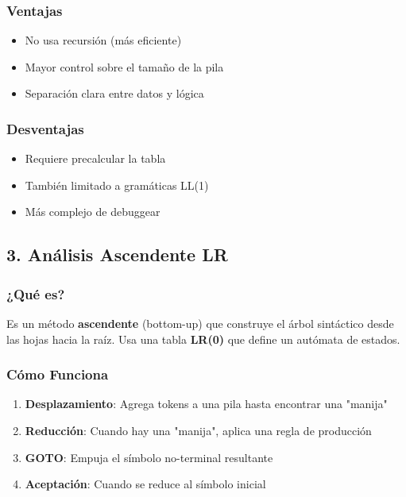\documentclass[12pt]{article}
\begin{document}
\subsubsection{Ventajas}

\begin{itemize}
    \item No usa recursión (más eficiente)
    \item Mayor control sobre el tamaño de la pila
    \item Separación clara entre datos y lógica
\end{itemize}

\subsubsection{Desventajas}

\begin{itemize}
    \item Requiere precalcular la tabla
    \item También limitado a gramáticas LL(1)
    \item Más complejo de debuggear
\end{itemize}


\subsection{3. Análisis Ascendente LR}

\subsubsection{¿Qué es?}

Es un método \textbf{ascendente} (bottom-up) que construye el árbol sintáctico desde las hojas hacia la raíz. Usa una tabla \textbf{LR(0)} que define un autómata de estados.

\subsubsection{Cómo Funciona}

\begin{enumerate}
    \item \textbf{Desplazamiento}: Agrega tokens a una pila hasta encontrar una "manija"
    \item \textbf{Reducción}: Cuando hay una "manija", aplica una regla de producción
    \item \textbf{GOTO}: Empuja el símbolo no-terminal resultante
    \item \textbf{Aceptación}: Cuando se reduce al símbolo inicial
\end{enumerate}
\end{document}
